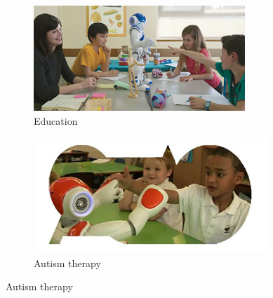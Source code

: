 \begin{figure}[H]
\centering
\begin{subfigure}[b]{0.45\textwidth}
\includegraphics[width=\textwidth]{assets/nao_education.png}
\caption{Education \cite{NaoRobot}}
\label{fig:nao_education}
\end{subfigure}
\begin{subfigure}[b]{0.45\textwidth}
\includegraphics[width=\textwidth]{assets/asknao.png}
\caption{Autism therapy \cite{ASKNao}}
\label{fig:asknao}
\end{subfigure}


\end{figure}
